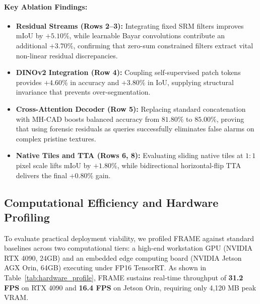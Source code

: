 \paragraph{Key Ablation Findings:}
\begin{itemize}
    \item \textbf{Residual Streams (Rows 2--3):} Integrating fixed SRM filters improves mIoU by $+5.10\%$, while learnable Bayar convolutions contribute an additional $+3.70\%$, confirming that zero-sum constrained filters extract vital non-linear residual discrepancies.
    \item \textbf{DINOv2 Integration (Row 4):} Coupling self-supervised patch tokens provides $+4.60\%$ in accuracy and $+3.80\%$ in IoU, supplying structural invariance that prevents over-segmentation.
    \item \textbf{Cross-Attention Decoder (Row 5):} Replacing standard concatenation with MH-CAD boosts balanced accuracy from $81.80\%$ to $85.00\%$, proving that using forensic residuals as queries successfully eliminates false alarms on complex pristine textures.
    \item \textbf{Native Tiles and TTA (Rows 6, 8):} Evaluating sliding native tiles at $1:1$ pixel scale lifts mIoU by $+1.80\%$, while bidirectional horizontal-flip TTA delivers the final $+0.80\%$ gain.
\end{itemize}

\subsection{Computational Efficiency and Hardware Profiling}
To evaluate practical deployment viability, we profiled FRAME against standard baselines across two computational tiers: a high-end workstation GPU (NVIDIA RTX 4090, 24GB) and an embedded edge computing board (NVIDIA Jetson AGX Orin, 64GB) executing under FP16 TensorRT. As shown in Table~\ref{tab:hardware_profile}, FRAME sustains real-time throughput of \textbf{31.2 FPS} on RTX 4090 and \textbf{16.4 FPS} on Jetson Orin, requiring only 4,120 MB peak VRAM.

